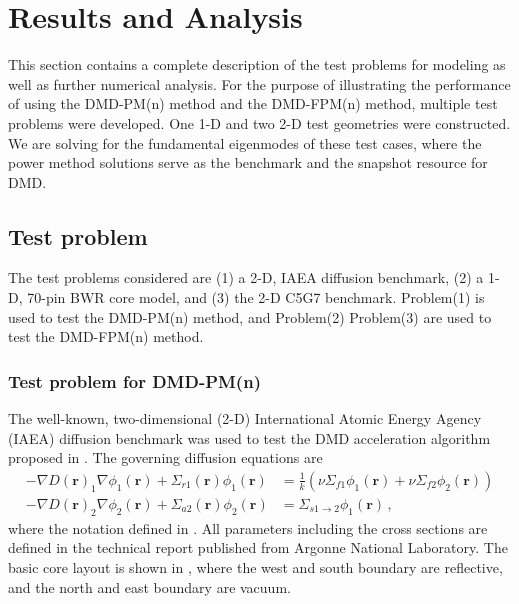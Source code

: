 \cleardoublepage

\chapter{Results and Analysis}
\label{chapter:results}
This section contains a complete description of the test problems for modeling as well as further numerical analysis.
For the purpose of illustrating the performance of using the DMD-PM(n) method and the DMD-FPM(n) method, multiple test problems were developed. 
One 1-D and two 2-D test geometries were constructed.
We are solving for the fundamental eigenmodes of these test cases, where the power method solutions serve as the benchmark and the snapshot resource for DMD. 

\section{Test problem}
The test problems considered are (1) a 2-D, IAEA diffusion benchmark, (2) a 1-D, 70-pin BWR core model, and (3) the 2-D C5G7 benchmark.
Problem(1) is used to test the DMD-PM(n) method, and Problem(2) Problem(3) are used to test the DMD-FPM(n) method.
\subsection{Test problem for DMD-PM(n)}
The well-known, two-dimensional (2-D) International Atomic Energy Agency (IAEA) diffusion benchmark was used to test the DMD acceleration algorithm proposed in .
The governing diffusion equations are
\begin{equation}
 \begin{split}
  -\nabla D(\mathbf{r})_1 \nabla \phi_1 (\mathbf{r}) + \Sigma_{r1}(\mathbf{r}) \phi_1 (\mathbf{r}) 
    &= \frac{1}{k} \left (\nu\Sigma_{f1}\phi_1(\mathbf{r}) + \nu\Sigma_{f2}\phi_2(\mathbf{r}) \right ) \\
 -\nabla D(\mathbf{r})_2 \nabla \phi_2 (\mathbf{r}) + \Sigma_{a2}(\mathbf{r}) \phi_2 (\mathbf{r}) 
    &= \Sigma_{s1\to 2}\phi_1(\mathbf{r}) \, ,
 \end{split}
 \label{eq:twogroupdiff}
\end{equation}
where the notation defined in .
All parameters including the cross sections are defined in the technical report published from Argonne National Laboratory\cite{center1977benchmark}.
The basic core layout is shown in , where the west and south boundary are reflective, and the north and east boundary are vacuum.

